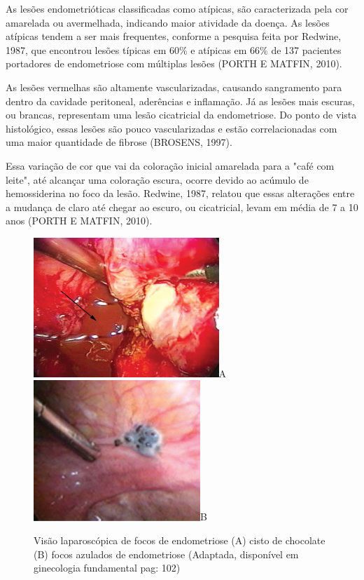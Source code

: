 \documentclass[12pt]{article} %
\begin{document}
As lesões endometrióticas classificadas como atípicas, são
caracterizada pela cor amarelada ou avermelhada, indicando maior
atividade da doença. As lesões atípicas tendem a ser mais frequentes,
conforme a pesquisa feita por Redwine, 1987, que encontrou lesões
típicas em 60\% e atípicas em 66\% de 137 pacientes portadores de
endometriose com múltiplas lesões (PORTH E MATFIN, 2010).

As lesões vermelhas são altamente vascularizadas, causando sangramento
para dentro da cavidade peritoneal, aderências e inflamação. Já as
lesões mais escuras, ou brancas, representam uma lesão cicatricial
da endometriose. Do ponto de vista histológico, essas lesões são pouco
vascularizadas e estão correlacionadas com uma maior quantidade de
fibrose (BROSENS, 1997).

Essa variação de cor que vai da coloração
inicial amarelada para a "café com leite", até alcançar uma coloração
escura, ocorre devido ao acúmulo de hemossiderina no
foco da lesão. Redwine, 1987, relatou que essas alterações entre a
mudança de claro até chegar ao escuro, ou cicatricial, levam em média
de 7 a 10 anos (PORTH E MATFIN, 2010).


\begin{figure}[h!] 
\centering
\includegraphics[width=7cm]{cistodechocolate.png}A
\includegraphics[width=6.3cm]{focos2.png}B
\caption[Endometriose: visão laparoscópica] {Visão laparoscópica de focos de endometriose (A) cisto de chocolate (B) focos azulados de endometriose (Adaptada, disponível em ginecologia fundamental pag: 102)}
\label{implantes do endometrio}
\end{figure} 
\end{document}
